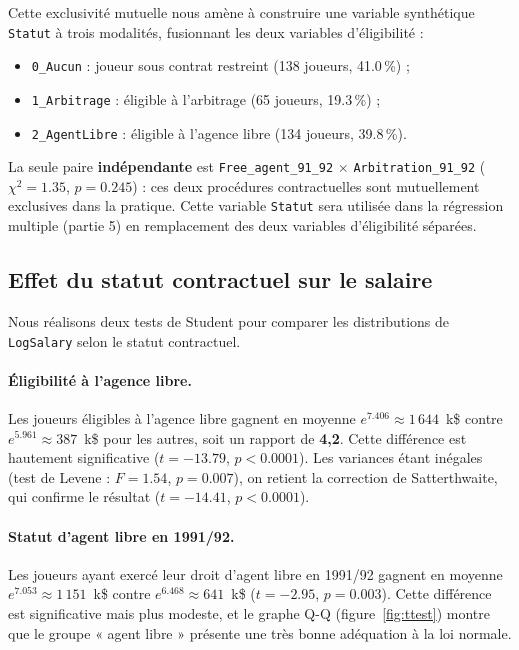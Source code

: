 \documentclass[11pt,a4paper]{article}
\begin{document}
Cette exclusivité mutuelle nous amène à construire une variable synthétique
\texttt{Statut} à trois modalités, fusionnant les deux variables d'éligibilité :
\begin{itemize}
  \item \texttt{0\_Aucun} : joueur sous contrat restreint (138 joueurs, 41.0\,\%) ;\vspace{0.3cm}
  \item \texttt{1\_Arbitrage} : éligible à l'arbitrage (65 joueurs, 19.3\,\%) ;\vspace{0.3cm}
  \item \texttt{2\_AgentLibre} : éligible à l'agence libre (134 joueurs, 39.8\,\%).
\end{itemize}

La seule paire \textbf{indépendante} est \texttt{Free\_agent\_91\_92}
$\times$ \texttt{Arbitration\_91\_92} ($\chi^2 = 1.35$, $p = 0.245$) :
ces deux procédures contractuelles sont mutuellement exclusives dans la pratique.
Cette variable \texttt{Statut} sera utilisée dans la régression multiple
(partie 5) en remplacement des deux variables d'éligibilité séparées.

\subsection{Effet du statut contractuel sur le salaire}

Nous réalisons deux tests de Student pour comparer les distributions de
\texttt{LogSalary} selon le statut contractuel.

\paragraph{Éligibilité à l'agence libre.}
Les joueurs éligibles à l'agence libre gagnent en moyenne
$e^{7.406} \approx 1\,644$~k\$ contre $e^{5.961} \approx 387$~k\$ pour les autres,
soit un rapport de \textbf{4,2}. Cette différence est hautement significative
($t = -13.79$, $p < 0.0001$). Les variances étant inégales (test de Levene :
$F = 1.54$, $p = 0.007$), on retient la correction de Satterthwaite, qui confirme le
résultat ($t = -14.41$, $p < 0.0001$).

\paragraph{Statut d'agent libre en 1991/92.}
Les joueurs ayant exercé leur droit d'agent libre en 1991/92 gagnent en moyenne
$e^{7.053} \approx 1\,151$~k\$ contre $e^{6.468} \approx 641$~k\$ ($t = -2.95$,
$p = 0.003$). Cette différence est significative mais plus modeste, et le graphe Q-Q
(figure~\ref{fig:ttest}) montre que le groupe « agent libre » présente une très bonne
adéquation à la loi normale.
\end{document}
